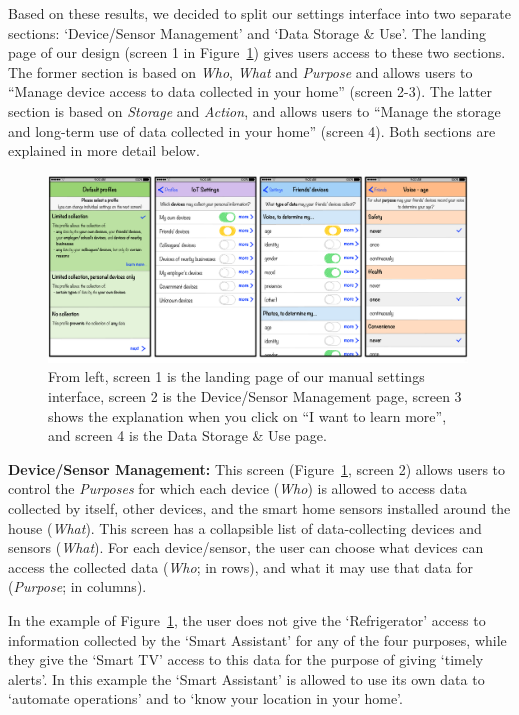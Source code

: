 Based on these results, we decided to split our settings interface into two separate sections: `Device/Sensor Management' and `Data Storage \& Use'. The landing page of our design (screen 1 in Figure~\ref{fig:access_interface}) gives users access to these two sections. The former section is based on \emph{Who}, \emph{What} and \emph{Purpose} and allows users to ``Manage device access to data collected in your home'' (screen 2-3). The latter section is based on \emph{Storage} and \emph{Action}, and allows users to ``Manage the storage and long-term use of data collected in your home'' (screen 4). Both sections are explained in more detail below.

\begin{figure}
	\centering
	\includegraphics[width=0.99\textwidth]{figures/interface.pdf}
	\caption{From left, screen 1 is the landing page of our manual settings interface, screen 2 is the Device/Sensor Management page, screen 3 shows the explanation when you click on ``I want to learn more'', and screen 4 is the Data Storage \& Use page.}
	\label{fig:access_interface}
\end{figure}

\textbf{Device/Sensor Management:} This screen (Figure~\ref{fig:access_interface}, screen 2) allows users to control the \emph{Purposes} for which each device (\emph{Who}) is allowed to access data collected by itself, other devices, and the smart home sensors installed around the house (\emph{What}). This screen has a collapsible list of data-collecting devices and sensors (\emph{What}). For each device/sensor, the user can choose what devices can access the collected data (\emph{Who}; in rows), and what it may use that data for (\emph{Purpose}; in columns).

In the example of Figure~\ref{fig:access_interface}, the user does not give the `Refrigerator' access to information collected by the `Smart Assistant' for any of the four purposes, while they give the `Smart TV' access to this data for the purpose of giving `timely alerts'. In this example the `Smart Assistant' is allowed to use its own data to `automate operations' and to `know your location in your home'.

